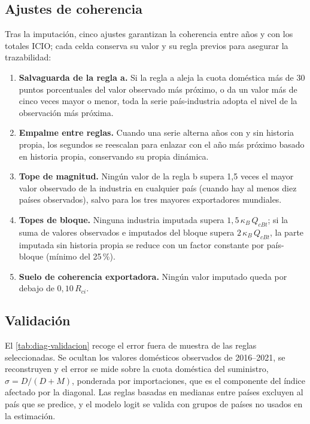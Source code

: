 \documentclass[final,1p,times,authoryear]{elsarticle}
\begin{document}
\subsection{Ajustes de coherencia}
Tras la imputación, cinco ajustes garantizan la coherencia entre años y con los totales ICIO; cada celda conserva su valor y su regla previos para asegurar la trazabilidad:
\begin{enumerate}[leftmargin=*,itemsep=2pt]
    \item \textbf{Salvaguarda de la regla a.} Si la regla a aleja la cuota doméstica más de 30 puntos porcentuales del valor observado más próximo, o da un valor más de cinco veces mayor o menor, toda la serie país-industria adopta el nivel de la observación más próxima.
    \item \textbf{Empalme entre reglas.} Cuando una serie alterna años con y sin historia propia, los segundos se reescalan para enlazar con el año más próximo basado en historia propia, conservando su propia dinámica.
    \item \textbf{Tope de magnitud.} Ningún valor de la regla b supera 1,5 veces el mayor valor observado de la industria en cualquier país (cuando hay al menos diez países observados), salvo para los tres mayores exportadores mundiales.
    \item \textbf{Topes de bloque.} Ninguna industria imputada supera $1{,}5\,\kappa_B\, Q_{cBt}$; si la suma de valores observados e imputados del bloque supera $2\,\kappa_B\, Q_{cBt}$, la parte imputada sin historia propia se reduce con un factor constante por país-bloque (mínimo del 25\,\%).
    \item \textbf{Suelo de coherencia exportadora.} Ningún valor imputado queda por debajo de $0{,}10\,R_{ci}$.
\end{enumerate}

\subsection{Validación}
El \cref{tab:diag-validacion} recoge el error fuera de muestra de las reglas seleccionadas. Se ocultan los valores domésticos observados de 2016--2021, se reconstruyen y el error se mide sobre la cuota doméstica del suministro, $\sigma = D/(D+M)$, ponderada por importaciones, que es el componente del índice afectado por la diagonal. Las reglas basadas en medianas entre países excluyen al país que se predice, y el modelo logit se valida con grupos de países no usados en la estimación.
\end{document}
